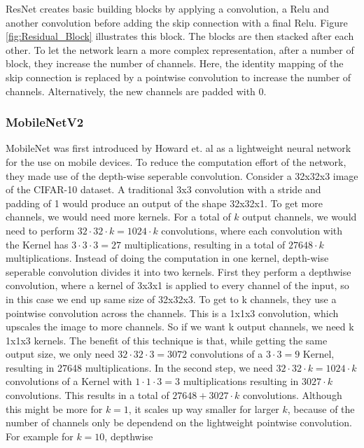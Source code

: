 ResNet creates basic building blocks by applying a convolution, a Relu and
another convolution before adding the skip connection with a final Relu. Figure
\ref{fig:Residual_Block} illustrates this block. The blocks are then stacked
after each other. To let the network learn a more complex representation, after
a number of block, they increase the number of channels. Here, the identity
mapping of the skip connection is replaced by a pointwise convolution to
increase the number of channels. Alternatively, the new channels are padded with
0.



\subsubsection{MobileNetV2}
MobileNet was first introduced by Howard et. al \cite{howard2017mobilenets} as a
lightweight neural network for the use on mobile devices. To reduce the
computation effort of the network, they made use of the depth-wise seperable
convolution. Consider a 32x32x3 image of the CIFAR-10 dataset. A traditional 3x3
convolution with a stride and padding of 1 would produce an output of the shape
32x32x1. To get more channels, we would need more kernels. For a total of $k$
output channels, we would need to perform $32\cdot 32 \cdot k=1024\cdot k$
convolutions, where each convolution with the Kernel has $3\cdot 3 \cdot 3=27$
multiplications, resulting in a total of $27648\cdot k$ multiplications.
Instead of doing the computation in one kernel, depth-wise seperable convolution
divides it into two kernels. First they perform a depthwise convolution, where a
kernel of 3x3x1 is applied to every channel of the input, so in this case we end
up same size of 32x32x3. To get to k channels, they use a pointwise convolution
across the channels. This is a 1x1x3 convolution, which upscales the image to
more channels. So if we want k output channels, we need k 1x1x3 kernels. The
benefit of this technique is that, while getting the same output size, we only
need $32\cdot 32 \cdot 3=3072$ convolutions of a $3\cdot 3=9$ Kernel, resulting
in 27648 multiplications. In the second step, we need $32\cdot 32\cdot
k=1024\cdot k$ convolutions of a Kernel with $1\cdot 1\cdot 3=3$ multiplications
resulting in $3027\cdot k$ convolutions. This results in a total of $27648 +
3027\cdot k$ convolutions. Although this might be more for $k=1$, it scales up
way smaller for larger $k$, because of the number of channels only be dependend
on the lightweight pointwise convolution. For example for $k=10$, depthwise
